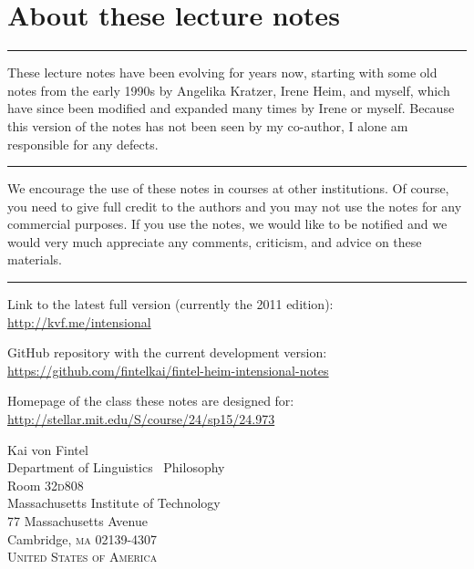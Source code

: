\frontmatter

\title{}
\author{\and{}} 
\date{}

\pagestyle{empty}

\maketitle

\clearpage

\section*{About these lecture notes}

\plainbreak{1} 

These lecture notes have been evolving for years now, starting with
some old notes from the early 1990s by Angelika Kratzer, Irene Heim,
and myself, which have since been modified and expanded many times by
Irene or myself. Because this version of the notes has not been seen
by my co-author, I alone am responsible for any defects.

\plainbreak{1} 

We encourage the use of these notes in courses at other institutions.
Of course, you need to give full credit to the authors and you may not
use the notes for any commercial purposes. If you use the notes, we
would like to be notified and we would very much appreciate any
comments, criticism, and advice on these materials.

\plainbreak{1}

Link to the latest full version (currently the 2011 edition):\\[6pt]
                                             \null\hfill\url{http://kvf.me/intensional}
\medskip
                                            
\noindent GitHub repository with the current development version:\\[6pt]
            \null\hfill\url{https://github.com/fintelkai/fintel-heim-intensional-notes}

\medskip

\noindent Homepage of the class these notes are designed for:\\[6pt]
                        \null\hfill\url{http://stellar.mit.edu/S/course/24/sp15/24.973}

\vfill

\noindent Kai von Fintel\\
Department of Linguistics \amp\ Philosophy\\
Room 32\textperiodcentered{}\textsc{d}808\\
Massachusetts Institute of Technology\\
77 Massachusetts Avenue\\
Cambridge, \textsc{ma} 02139-4307\\
\textsc{United States of America} 

